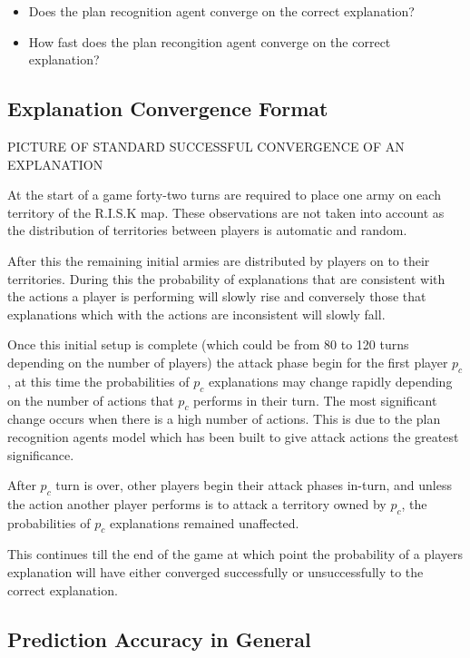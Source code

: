 \documentclass[parskip]{cs4rep}
\begin{document}
\begin{itemize}
\item
Does the plan recognition agent converge on the correct explanation?
\item
How fast does the plan recongition agent converge on the correct explanation?
\end{itemize}

\subsection{Explanation Convergence Format}

PICTURE OF STANDARD SUCCESSFUL CONVERGENCE OF AN EXPLANATION

At the start of a game forty-two turns are required to place one army on each territory of the R.I.S.K map. These observations are not taken into account as the distribution of territories between players is automatic and random. 

After this the remaining initial armies are distributed by players on to their territories. During this the probability of explanations that are consistent with the actions a player is performing will slowly rise and conversely those that explanations which with the actions are inconsistent will slowly fall.

Once this initial setup is complete (which could be from 80 to 120 turns depending on the number of players) the attack phase begin for the first player $p_c$, at this time the probabilities of $p_c$ explanations may change rapidly depending on the number of actions that $p_c$ performs in their turn. The most significant change occurs when there is a high number of actions. This is due to the plan recognition agents model which has been built to give attack actions the greatest significance.

After $p_c$ turn is over, other players begin their attack phases in-turn, and unless the action another player performs is to attack a territory owned by $p_c$, the probabilities of $p_c$ explanations remained unaffected. 

This continues till the end of the game at which point the probability of a players explanation will have either converged successfully or unsuccessfully to the correct explanation. 

\subsection{Prediction Accuracy in General}
\end{document}
